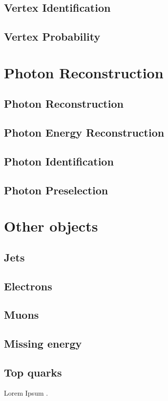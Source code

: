 \subsection{Vertex Identification}
\subsection{Vertex Probability}

\section{Photon Reconstruction} 
\label{reco:sec:photons}
\subsection{Photon Reconstruction}
\subsection{Photon Energy Reconstruction}
\subsection{Photon Identification}
\subsection{Photon Preselection}

\section{Other objects} 
\label{reco:sec:other}
\subsection{Jets}
\subsection{Electrons}
\subsection{Muons}
\subsection{Missing energy}
\subsection{Top quarks}

Lorem Ipsum \cite{PDGBooklet}.
